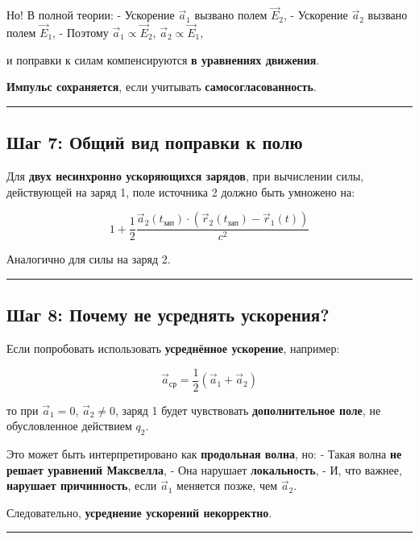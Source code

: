 \documentclass[11pt]{article}
\begin{document}
Но! В полной теории: - Ускорение \(\vec{a}_1\) вызвано полем
\(\vec{E}_2\), - Ускорение \(\vec{a}_2\) вызвано полем \(\vec{E}_1\), -
Поэтому \(\vec{a}_1 \propto \vec{E}_2\),
\(\vec{a}_2 \propto \vec{E}_1\),

и поправки к силам компенсируются \textbf{в уравнениях движения}.

 \textbf{Импульс сохраняется}, если учитывать
\textbf{самосогласованность}.

\begin{center}\rule{0.5\linewidth}{\linethickness}\end{center}

\subsection{ Шаг 7: Общий вид поправки к полю}

Для \textbf{двух несинхронно ускоряющихся зарядов}, при вычислении силы,
действующей на заряд 1, поле источника 2 должно быть умножено на:

\[
\boxed{
1 + \frac{1}{2} \frac{\vec{a}_2(t_{\text{зап}}) \cdot (\vec{r}_2(t_{\text{зап}}) - \vec{r}_1(t))}{c^2}
}
\]

Аналогично для силы на заряд 2.

\begin{center}\rule{0.5\linewidth}{\linethickness}\end{center}

\subsection{ Шаг 8: Почему не усреднять ускорения?}

Если попробовать использовать \textbf{усреднённое ускорение}, например:

\[
\vec{a}_{\text{ср}} = \frac{1}{2} (\vec{a}_1 + \vec{a}_2)
\]

то при \(\vec{a}_1 = 0\), \(\vec{a}_2 \ne 0\), заряд 1 будет чувствовать
\textbf{дополнительное поле}, не обусловленное действием \(q_2\).

Это может быть интерпретировано как \textbf{продольная волна}, но: -
Такая волна \textbf{не решает уравнений Максвелла}, - Она нарушает
\textbf{локальность}, - И, что важнее, \textbf{нарушает причинность},
если \(\vec{a}_1\) меняется позже, чем \(\vec{a}_2\).

 Следовательно, \textbf{усреднение ускорений некорректно}.

\begin{center}\rule{0.5\linewidth}{\linethickness}\end{center}
\end{document}
